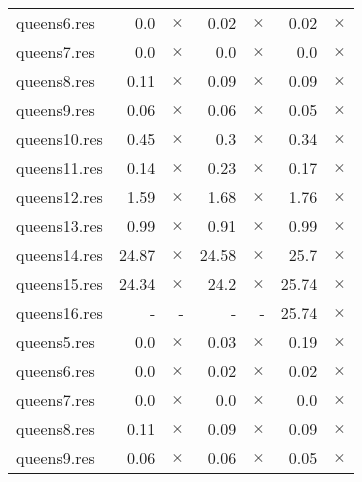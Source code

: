 \documentclass{article}
\begin{document}
\begin{center}
\begin{tabular}{l
rrrrrr}
queens6.res & 0.0 & 
$\times$
 & 0.02 & 
$\times$
 & 0.02 & 
$\times$
\\
queens7.res & 0.0 & 
$\times$
 & 0.0 & 
$\times$
 & 0.0 & 
$\times$
\\
queens8.res & 0.11 & 
$\times$
 & 0.09 & 
$\times$
 & 0.09 & 
$\times$
\\
queens9.res & 0.06 & 
$\times$
 & 0.06 & 
$\times$
 & 0.05 & 
$\times$
\\
queens10.res & 0.45 & 
$\times$
 & 0.3 & 
$\times$
 & 0.34 & 
$\times$
\\
queens11.res & 0.14 & 
$\times$
 & 0.23 & 
$\times$
 & 0.17 & 
$\times$
\\
queens12.res & 1.59 & 
$\times$
 & 1.68 & 
$\times$
 & 1.76 & 
$\times$
\\
queens13.res & 0.99 & 
$\times$
 & 0.91 & 
$\times$
 & 0.99 & 
$\times$
\\
queens14.res & 24.87 & 
$\times$
 & 24.58 & 
$\times$
 & 25.7 & 
$\times$
\\
queens15.res & 24.34 & 
$\times$
 & 24.2 & 
$\times$
 & 25.74 & 
$\times$
\\
queens16.res & - & - 
 & - & - 
 & 25.74 & 
$\times$
\\
queens5.res & 0.0 & 
$\times$
 & 0.03 & 
$\times$
 & 0.19 & 
$\times$
\\
queens6.res & 0.0 & 
$\times$
 & 0.02 & 
$\times$
 & 0.02 & 
$\times$
\\
queens7.res & 0.0 & 
$\times$
 & 0.0 & 
$\times$
 & 0.0 & 
$\times$
\\
queens8.res & 0.11 & 
$\times$
 & 0.09 & 
$\times$
 & 0.09 & 
$\times$
\\
queens9.res & 0.06 & 
$\times$
 & 0.06 & 
$\times$
 & 0.05 & 
$\times$
\\
\hline\end{tabular}
\end{center}
\end{document}
